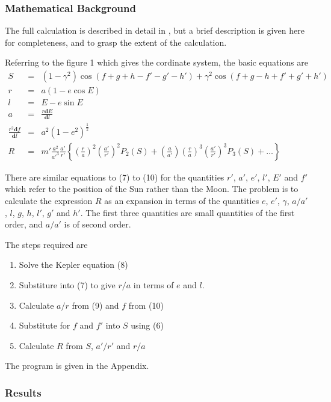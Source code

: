 \subsubsection{Mathematical Background}

The full calculation is described in detail in \cite{Brown:1896}, but a
brief description is given here for completeness, and to grasp the
extent of the calculation.

Referring to the figure 1 which gives the cordinate system, the basic
equations are
\begin{eqnarray}
S  & = & (1-\gamma ^2)\cos(f + g +h -f' -g' -h')
+ \gamma ^2 \cos(f + g -h +f' +g' +h') \\
r & = & a (1 - e \cos E) \\
l & = & E - e \sin E \\
a & = & \frac{r\mathbf{d} E}{\mathbf{d}l} \\
\frac{r ^2 \mathbf{d} f}{\mathbf{d} l} & = & a^2 (1 - e^2)^{\frac{1}{2}}\\
R & = & m' \frac{a^2}{{a'}^3} \frac{a'}{r'} \left \{ \left (\frac{r}{a}\right )^2
\left (\frac{a'}{r'}\right )^2 P_2(S) +
\left (\frac{a}{a'}\right )\left
(\frac{r}{a}\right )^3 \left (\frac{a'}{r'}\right )^3 P_3(S)
+ \ldots \right \}
\end{eqnarray}

There are similar equations to (7) to (10) for the quantities $r'$,
$a'$, $e'$, $l'$, $E'$ and $f'$ which refer to the position of the Sun
rather than the Moon.  The problem is to calculate the expression $R$
as an expansion in terms of the quantities $e$, $e'$, $\gamma$,
$a/a'$, $l$, $g$, $h$, $l'$, $g'$ and $h'$.  The first three
quantities are small quantities of the first order, and $a/a'$ is of
second order.

The steps required are
\begin{enumerate}
\item Solve the Kepler equation (8)
\item Substiture into (7) to give $r/a$ in terms of $e$ and $l$.
\item Calculate $a/r$ from (9) and $f$ from (10)
\item Substitute for $f$ and $f'$ into $S$ using (6)
\item Calculate $R$ from $S$, $a'/r'$ and $r/a$
\end{enumerate}

The program is given in the Appendix.

\subsubsection{Results}

